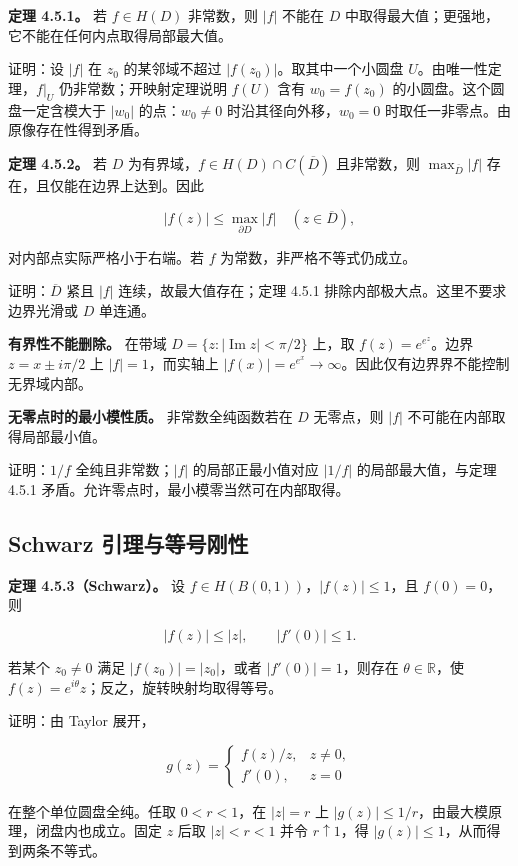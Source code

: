 \documentclass[11pt,a4paper]{article}
\begin{document}
\textbf{定理 4.5.1。} 若 \(f\in H(D)\) 非常数，则 \(|f|\) 不能在 \(D\)
中取得最大值；更强地，它不能在任何内点取得局部最大值。

证明：设 \(|f|\) 在 \(z_0\) 的某邻域不超过
\(|f(z_0)|\)。取其中一个小圆盘 \(U\)。由唯一性定理，\(f|_U\)
仍非常数；开映射定理说明 \(f(U)\) 含有 \(w_0=f(z_0)\)
的小圆盘。这个圆盘一定含模大于 \(|w_0|\) 的点：\(w_0\ne0\)
时沿其径向外移，\(w_0=0\) 时取任一非零点。由原像存在性得到矛盾。

\textbf{定理 4.5.2。} 若 \(D\)
为有界域，\(f\in H(D)\cap C(\overline D)\) 且非常数，则
\(\max_{\overline D}|f|\) 存在，且仅能在边界上达到。因此

\[
|f(z)|\le\max_{\partial D}|f|\quad(z\in\overline D),
\]

对内部点实际严格小于右端。若 \(f\) 为常数，非严格不等式仍成立。

证明：\(\overline D\) 紧且 \(|f|\) 连续，故最大值存在；定理 4.5.1
排除内部极大点。这里不要求边界光滑或 \(D\) 单连通。

\textbf{有界性不能删除。} 在带域 \(D=\{z:|\operatorname{Im}z|<\pi/2\}\)
上，取 \(f(z)=e^{e^z}\)。边界 \(z=x\pm i\pi/2\) 上 \(|f|=1\)，而实轴上
\(|f(x)|=e^{e^x}\to\infty\)。因此仅有边界界不能控制无界域内部。

\textbf{无零点时的最小模性质。} 非常数全纯函数若在 \(D\) 无零点，则
\(|f|\) 不可能在内部取得局部最小值。

证明：\(1/f\) 全纯且非常数；\(|f|\) 的局部正最小值对应 \(|1/f|\)
的局部最大值，与定理 4.5.1 矛盾。允许零点时，最小模零当然可在内部取得。

\subsection{Schwarz 引理与等号刚性}\label{ch04-s5-heading-2}

\textbf{定理 4.5.3（Schwarz）。} 设
\(f\in H(B(0,1))\)，\(|f(z)|\le1\)，且 \(f(0)=0\)，则

\[
|f(z)|\le|z|,\qquad |f'(0)|\le1.
\]

若某个 \(z_0\ne0\) 满足 \(|f(z_0)|=|z_0|\)，或者 \(|f'(0)|=1\)，则存在
\(\theta\in\mathbb R\)，使
\(f(z)=e^{i\theta}z\)；反之，旋转映射均取得等号。

证明：由 Taylor 展开，

\[
g(z)=\begin{cases}f(z)/z,&z\ne0,\\f'(0),&z=0\end{cases}
\]

在整个单位圆盘全纯。任取 \(0<r<1\)，在 \(|z|=r\) 上
\(|g(z)|\le1/r\)，由最大模原理，闭盘内也成立。固定 \(z\) 后取
\(|z|<r<1\) 并令 \(r\uparrow1\)，得 \(|g(z)|\le1\)，从而得到两条不等式。
\end{document}
